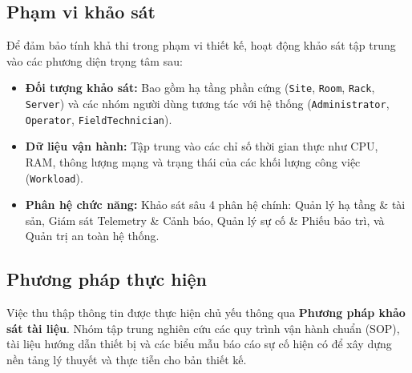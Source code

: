 \subsection{Phạm vi khảo sát}
Để đảm bảo tính khả thi trong phạm vi thiết kế, hoạt động khảo sát tập trung vào các phương diện trọng tâm sau:
\begin{itemize}[leftmargin=2em]
    \item \textbf{Đối tượng khảo sát:} Bao gồm hạ tầng phần cứng (\texttt{Site}, \texttt{Room}, \texttt{Rack}, \texttt{Server}) và các nhóm người dùng tương tác với hệ thống (\texttt{Administrator}, \texttt{Operator}, \texttt{FieldTechnician}).
    \item \textbf{Dữ liệu vận hành:} Tập trung vào các chỉ số thời gian thực như CPU, RAM, thông lượng mạng và trạng thái của các khối lượng công việc (\texttt{Workload}).
    \item \textbf{Phân hệ chức năng:} Khảo sát sâu 4 phân hệ chính: Quản lý hạ tầng \& tài sản, Giám sát Telemetry \& Cảnh báo, Quản lý sự cố \& Phiếu bảo trì, và Quản trị an toàn hệ thống.
\end{itemize}

\subsection{Phương pháp thực hiện}
Việc thu thập thông tin được thực hiện chủ yếu thông qua \textbf{Phương pháp khảo sát tài liệu}. Nhóm tập trung nghiên cứu các quy trình vận hành chuẩn (SOP), tài liệu hướng dẫn thiết bị và các biểu mẫu báo cáo sự cố hiện có để xây dựng nền tảng lý thuyết và thực tiễn cho bản thiết kế.
